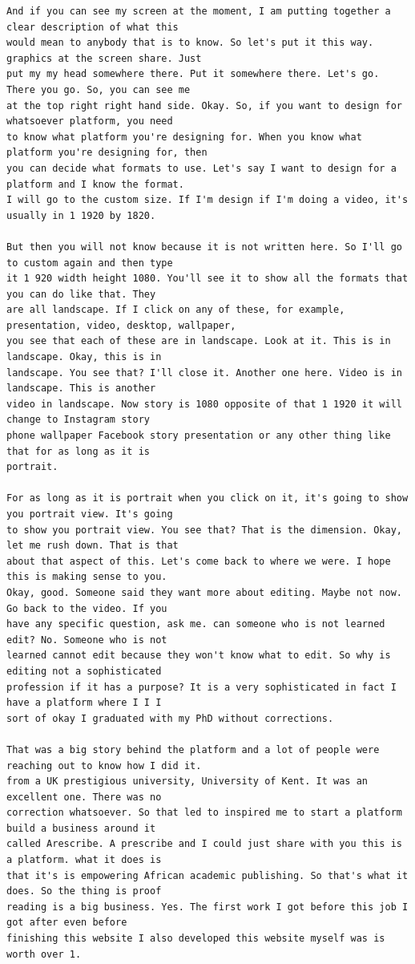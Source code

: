 {\begin{Verbatim}
And if you can see my screen at the moment, I am putting together a clear description of what this
would mean to anybody that is to know. So let's put it this way. graphics at the screen share. Just
put my my head somewhere there. Put it somewhere there. Let's go. There you go. So, you can see me
at the top right right hand side. Okay. So, if you want to design for whatsoever platform, you need
to know what platform you're designing for. When you know what platform you're designing for, then
you can decide what formats to use. Let's say I want to design for a platform and I know the format.
I will go to the custom size. If I'm design if I'm doing a video, it's usually in 1 1920 by 1820.

But then you will not know because it is not written here. So I'll go to custom again and then type
it 1 920 width height 1080. You'll see it to show all the formats that you can do like that. They
are all landscape. If I click on any of these, for example, presentation, video, desktop, wallpaper,
you see that each of these are in landscape. Look at it. This is in landscape. Okay, this is in
landscape. You see that? I'll close it. Another one here. Video is in landscape. This is another
video in landscape. Now story is 1080 opposite of that 1 1920 it will change to Instagram story
phone wallpaper Facebook story presentation or any other thing like that for as long as it is
portrait.

For as long as it is portrait when you click on it, it's going to show you portrait view. It's going
to show you portrait view. You see that? That is the dimension. Okay, let me rush down. That is that
about that aspect of this. Let's come back to where we were. I hope this is making sense to you.
Okay, good. Someone said they want more about editing. Maybe not now. Go back to the video. If you
have any specific question, ask me. can someone who is not learned edit? No. Someone who is not
learned cannot edit because they won't know what to edit. So why is editing not a sophisticated
profession if it has a purpose? It is a very sophisticated in fact I have a platform where I I I
sort of okay I graduated with my PhD without corrections.

That was a big story behind the platform and a lot of people were reaching out to know how I did it.
from a UK prestigious university, University of Kent. It was an excellent one. There was no
correction whatsoever. So that led to inspired me to start a platform build a business around it
called Arescribe. A prescribe and I could just share with you this is a platform. what it does is
that it's is empowering African academic publishing. So that's what it does. So the thing is proof
reading is a big business. Yes. The first work I got before this job I got after even before
finishing this website I also developed this website myself was is worth over 1.


\end{Verbatim}}
